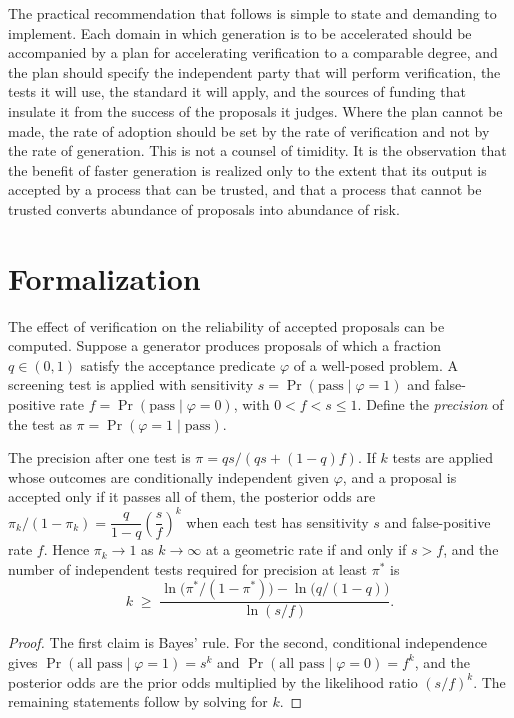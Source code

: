 The practical recommendation that follows is simple to state and demanding to implement. Each domain in which generation is to be accelerated should be accompanied by a plan for accelerating verification to a comparable degree, and the plan should specify the independent party that will perform verification, the tests it will use, the standard it will apply, and the sources of funding that insulate it from the success of the proposals it judges. Where the plan cannot be made, the rate of adoption should be set by the rate of verification and not by the rate of generation. This is not a counsel of timidity. It is the observation that the benefit of faster generation is realized only to the extent that its output is accepted by a process that can be trusted, and that a process that cannot be trusted converts abundance of proposals into abundance of risk.

\section*{Formalization}

The effect of verification on the reliability of accepted proposals can be computed. Suppose a generator produces proposals of which a fraction $q\in(0,1)$ satisfy the acceptance predicate $\varphi$ of a well-posed problem. A screening test is applied with sensitivity $s=\Pr(\text{pass}\mid\varphi=1)$ and false-positive rate $f=\Pr(\text{pass}\mid\varphi=0)$, with $0<f<s\le1$. Define the \emph{precision} of the test as $\pi=\Pr(\varphi=1\mid\text{pass})$.

\begin{proposition}
The precision after one test is $\pi=qs/(qs+(1-q)f)$. If $k$ tests are applied whose outcomes are conditionally independent given $\varphi$, and a proposal is accepted only if it passes all of them, the posterior odds are $\pi_k/(1-\pi_k)=\dfrac{q}{1-q}\left(\dfrac{s}{f}\right)^k$ when each test has sensitivity $s$ and false-positive rate $f$. Hence $\pi_k\to1$ as $k\to\infty$ at a geometric rate if and only if $s>f$, and the number of independent tests required for precision at least $\pi^\ast$ is
\[
k\;\ge\;\frac{\ln\bigl(\pi^\ast/(1-\pi^\ast)\bigr)-\ln\bigl(q/(1-q)\bigr)}{\ln(s/f)} .
\]
\end{proposition}

\begin{proof}
The first claim is Bayes' rule. For the second, conditional independence gives $\Pr(\text{all pass}\mid\varphi=1)=s^k$ and $\Pr(\text{all pass}\mid\varphi=0)=f^k$, and the posterior odds are the prior odds multiplied by the likelihood ratio $(s/f)^k$. The remaining statements follow by solving for $k$.
\end{proof}

